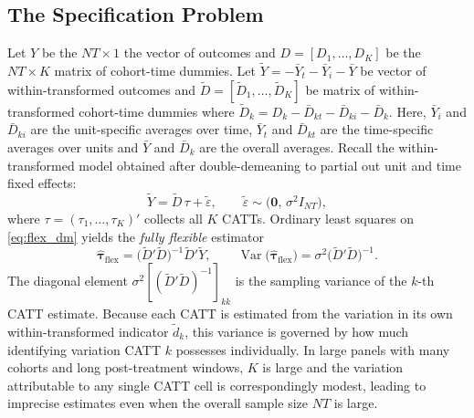 \documentclass[margin=3in, 12pt]{article}
\DeclareMathOperator{\Var}{Var}
\newcommand{\1}{\mathbbm{1}}
\newcommand{\Dtd}{\tilde{D}}
\begin{document}
\subsection{The Specification Problem}
Let $Y$ be the $NT \times 1$ the vector of outcomes and $D = [D_1, \ldots, D_K]$ be the $NT \times K$ matrix of cohort-time dummies. Let $\tilde{Y} =  - \bar{Y}_t - \bar{Y}_i - \bar{Y}$ be vector of within-transformed outcomes and $\tilde{D} = [\tilde{D}_1, \ldots, \tilde{D}_K]$ be matrix of within-transformed cohort-time dummies where $\tilde{D}_k = D_k - \bar{D}_{kt} - \bar{D}_{ki}  - \bar{D}_k$. Here, $\bar Y_i$ and $\bar D_{ki}$ are the unit-specific averages over time, $\bar Y_t$ and $\bar D_{kt}$ are the time-specific averages over units and $\bar Y$ and $\bar D_k$ are the overall averages. Recall the within-transformed model obtained after double-demeaning to
partial out unit and time fixed effects:
\begin{equation}
  \tilde{Y} = \Dtd\,\tau + \tilde{\varepsilon},
  \qquad
  \tilde{\varepsilon} \sim \bigl(\mathbf{0},\,\sigma^2 I_{NT}\bigr),
  \label{eq:flex_dm}
\end{equation}
where $\tau =
(\tau_1,\ldots,\tau_K)'$ collects all $K$ CATTs.
Ordinary least squares on \eqref{eq:flex_dm} yields the \emph{fully
flexible} estimator
\begin{equation}
  \hat{\bm{\tau}}_{\text{flex}}
  = \bigl(\Dtd'\Dtd\bigr)^{-1}\Dtd'\tilde{Y},
  \qquad
  \Var\bigl(\hat{\bm{\tau}}_{\text{flex}}\bigr)
  = \sigma^2\bigl(\Dtd'\Dtd\bigr)^{-1}.
  \label{eq:flex_var}
\end{equation}
The diagonal element $\sigma^2[(\Dtd'\Dtd)^{-1}]_{kk}$ is the sampling
variance of the $k$-th CATT estimate.
Because each CATT is estimated from the variation in its own
within-transformed indicator $\tilde{d}_k$, this variance is governed
by how much identifying variation CATT $k$ possesses individually.
In large panels with many cohorts and long post-treatment windows, $K$
is large and the variation attributable to any single CATT cell is
correspondingly modest, leading to imprecise estimates even when the
overall sample size $NT$ is large.
\end{document}
